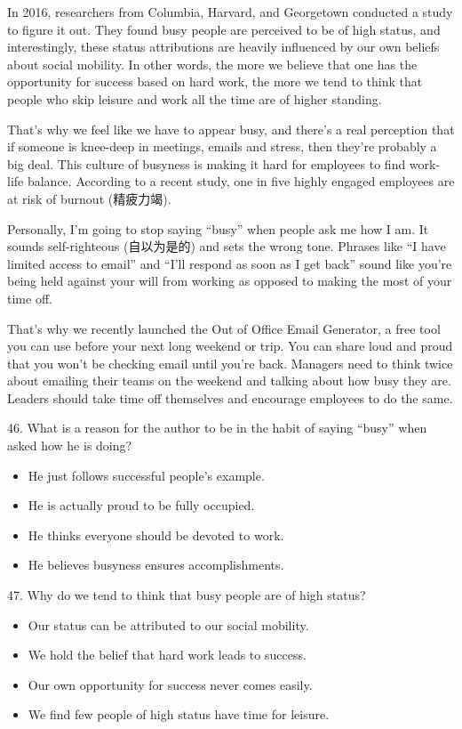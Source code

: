 \documentclass[UTF8,11pt]{ctexart}
\begin{document}
In 2016, researchers from Columbia, Harvard, and Georgetown conducted a study to figure it out. They found busy people are perceived to be of high status, and interestingly, these status attributions are heavily influenced by our own beliefs about social mobility. In other words, the more we believe that one has the opportunity for success based on hard work, the more we tend to think that people who skip leisure and work all the time are of higher standing.


That’s why we feel like we have to appear busy, and there’s a real perception that if someone is knee-deep in meetings, emails and stress, then they’re probably a big deal. This culture of busyness is making it hard for employees to find work-life balance. According to a recent study, one in five highly engaged employees are at risk of burnout (精疲力竭).


Personally, I’m going to stop saying “busy” when people ask me how I am. It sounds self-righteous (自以为是的) and sets the wrong tone. Phrases like “I have limited access to email” and “I’ll respond as soon as I get back” sound like you’re being held against your will from working as opposed to making the most of your time off.


That’s why we recently launched the Out of Office Email Generator, a free tool you can use before your next long weekend or trip. You can share loud and proud that you won’t be checking email until you’re back. Managers need to think twice about emailing their teams on the weekend and talking about how busy they are. Leaders should take time off themselves and encourage employees to do the same.


46. What is a reason for the author to be in the habit of saying “busy” when asked how he is doing?


\begin{itemize}[leftmargin=2em,itemsep=.2em,topsep=.4em]\item[A.] He just follows successful people’s example.
\item[B.] He is actually proud to be fully occupied.
\item[C.] He thinks everyone should be devoted to work.
\item[D.] He believes busyness ensures accomplishments.
\end{itemize}

47. Why do we tend to think that busy people are of high status?


\begin{itemize}[leftmargin=2em,itemsep=.2em,topsep=.4em]\item[A.] Our status can be attributed to our social mobility.
\item[B.] We hold the belief that hard work leads to success.
\item[C.] Our own opportunity for success never comes easily.
\item[D.] We find few people of high status have time for leisure.
\end{itemize}
\end{document}
